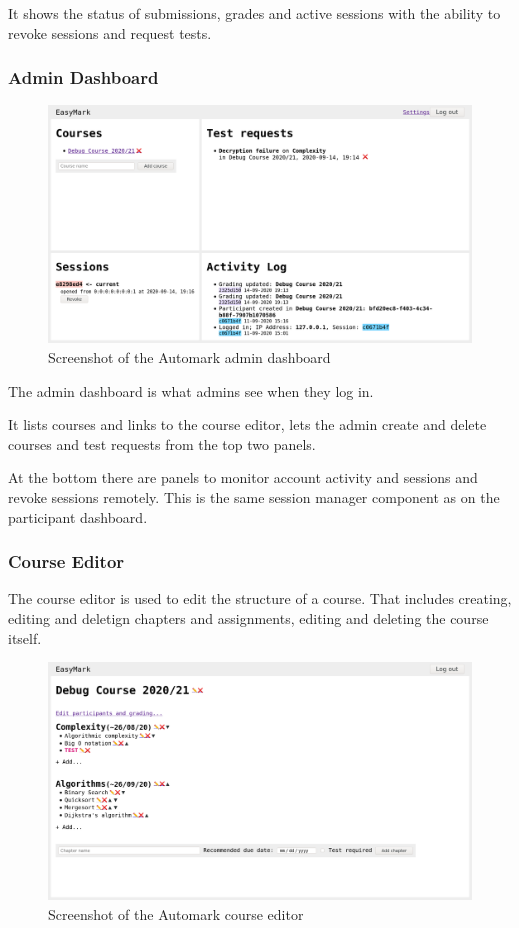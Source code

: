 \documentclass[12pt,a4paper,oneside]{report}
\begin{document}
	It shows the status of submissions, grades and active sessions with the ability to revoke sessions and request tests.

	\pagebreak
	\subsubsection{Admin Dashboard}
	\begin{figure}[H]
		\centering
		\includegraphics[width=.85\textwidth]{easymark_admin_dashboard.png}
		\caption{Screenshot of the Automark admin dashboard}
	\end{figure}

	The admin dashboard is what admins see when they log in.

	It lists courses and links to the course editor, lets the admin create and delete courses and test requests from the top two panels.

	At the bottom there are panels to monitor account activity and sessions and revoke sessions remotely. This is the same session manager component as on the participant dashboard.

	\subsubsection{Course Editor}
	The course editor is used to edit the structure of a course. That includes creating, editing and deletign chapters and assignments, editing and deleting the course itself.

	\begin{figure}[H]
		\centering
		\includegraphics[width={.85\textwidth}]{easymark_course_editor.png}
		\caption{Screenshot of the Automark course editor}
	\end{figure}
\end{document}
